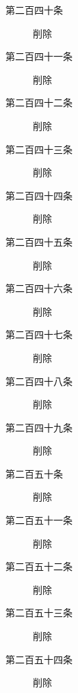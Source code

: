 \documentclass[twocolumn,a4j,10pt]{ltjtarticle}
\begin{document}
\begin{description}
\item[第二百四十条]削除
\end{description}
\begin{description}
\item[第二百四十一条]削除
\end{description}
\begin{description}
\item[第二百四十二条]削除
\end{description}
\begin{description}
\item[第二百四十三条]削除
\end{description}
\begin{description}
\item[第二百四十四条]削除
\end{description}
\begin{description}
\item[第二百四十五条]削除
\end{description}
\begin{description}
\item[第二百四十六条]削除
\end{description}
\begin{description}
\item[第二百四十七条]削除
\end{description}
\begin{description}
\item[第二百四十八条]削除
\end{description}
\begin{description}
\item[第二百四十九条]削除
\end{description}
\begin{description}
\item[第二百五十条]削除
\end{description}
\begin{description}
\item[第二百五十一条]削除
\end{description}
\begin{description}
\item[第二百五十二条]削除
\end{description}
\begin{description}
\item[第二百五十三条]削除
\end{description}
\begin{description}
\item[第二百五十四条]削除
\end{description}
\end{document}

